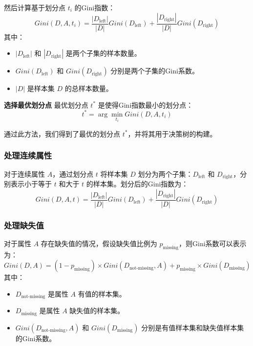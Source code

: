 然后计算基于划分点 \(t_i\) 的Gini指数：
\begin{equation}
	Gini(D, A, t_i) = \frac{|D_{\text{left}}|}{|D|} Gini(D_{\text{left}}) + \frac{|D_{\text{right}}|}{|D|} Gini(D_{\text{right}})
\end{equation}
其中：
\begin{itemize}
	\item \(|D_{\text{left}}|\) 和 \(|D_{\text{right}}|\) 是两个子集的样本数量。
	\item \(Gini(D_{\text{left}})\) 和 \(Gini(D_{\text{right}})\) 分别是两个子集的Gini系数。
	\item \(|D|\) 是样本集 \(D\) 的总样本数量。
\end{itemize}

\par
\textbf{选择最优划分点}
最优划分点 \(t^*\) 是使得Gini指数最小的划分点：
\begin{equation}
	t^* = \arg\min_{t_i} Gini(D, A, t_i)
\end{equation}

通过此方法，我们得到了最优的划分点 \(t^*\)，并将其用于决策树的构建。
\vspace*{1cm}
\subsubsection*{处理连续属性}
对于连续属性 \(A\)，通过划分点 \(t\) 将样本集 \(D\) 划分为两个子集：\(D_{\text{left}}\) 和 \(D_{\text{right}}\)，分别表示小于等于 \(t\) 和大于 \(t\) 的样本集。划分后的Gini指数为：
\begin{equation}
	Gini(D, A, t) = \frac{|D_{\text{left}}|}{|D|} Gini(D_{\text{left}}) + \frac{|D_{\text{right}}|}{|D|} Gini(D_{\text{right}})
\end{equation}

\vspace*{1cm}
\subsubsection*{处理缺失值}
对于属性 \(A\) 存在缺失值的情况，假设缺失值比例为 \(p_{\text{missing}}\)，则Gini系数可以表示为：
\begin{equation}
	Gini(D, A) = (1 - p_{\text{missing}}) \times Gini(D_{\text{not-missing}}, A) + p_{\text{missing}} \times Gini(D_{\text{missing}})
\end{equation}
其中：
\begin{itemize}
	\item \(D_{\text{not-missing}}\) 是属性 \(A\) 有值的样本集。
	\item \(D_{\text{missing}}\) 是属性 \(A\) 缺失值的样本集。
	\item \(Gini(D_{\text{not-missing}}, A)\) 和 \(Gini(D_{\text{missing}})\) 分别是有值样本集和缺失值样本集的Gini系数。
\end{itemize}
\vspace*{1cm}

